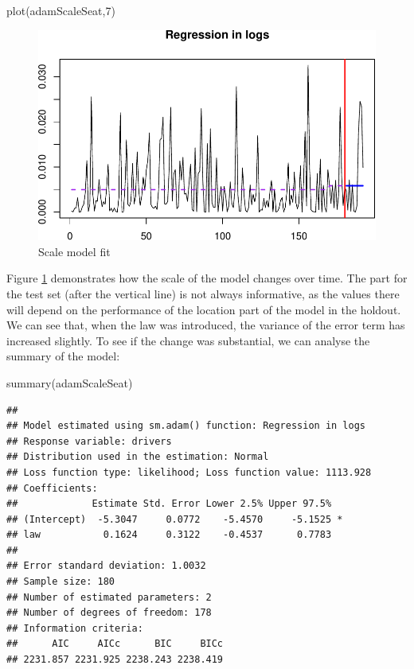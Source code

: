 \documentclass[
]{book}
\newenvironment{Shaded}{\begin{snugshade}}{\end{snugshade}}
\newcommand{\DecValTok}[1]{\textcolor[rgb]{0.00,0.00,0.81}{#1}}
\newcommand{\FunctionTok}[1]{\textcolor[rgb]{0.00,0.00,0.00}{#1}}
\newcommand{\NormalTok}[1]{#1}
\theoremstyle{definition}
\theoremstyle{definition}
\theoremstyle{definition}
\theoremstyle{definition}
\theoremstyle{remark}
\begin{document}
\begin{Shaded}
\begin{Highlighting}[]
\FunctionTok{plot}\NormalTok{(adamScaleSeat,}\DecValTok{7}\NormalTok{)}
\end{Highlighting}
\end{Shaded}

\begin{figure}
\centering
\includegraphics{Svetunkov--2022----ADAM_files/figure-latex/adamModelETSXMNMSMTime-1.pdf}
\caption{\label{fig:adamModelETSXMNMSMTime}Scale model fit}
\end{figure}

Figure \ref{fig:adamModelETSXMNMSMTime} demonstrates how the scale of the model changes over time. The part for the test set (after the vertical line) is not always informative, as the values there will depend on the performance of the location part of the model in the holdout. We can see that, when the law was introduced, the variance of the error term has increased slightly. To see if the change was substantial, we can analyse the summary of the model:

\begin{Shaded}
\begin{Highlighting}[]
\FunctionTok{summary}\NormalTok{(adamScaleSeat)}
\end{Highlighting}
\end{Shaded}

\begin{verbatim}
## 
## Model estimated using sm.adam() function: Regression in logs
## Response variable: drivers
## Distribution used in the estimation: Normal
## Loss function type: likelihood; Loss function value: 1113.928
## Coefficients:
##             Estimate Std. Error Lower 2.5% Upper 97.5%  
## (Intercept)  -5.3047     0.0772    -5.4570     -5.1525 *
## law           0.1624     0.3122    -0.4537      0.7783  
## 
## Error standard deviation: 1.0032
## Sample size: 180
## Number of estimated parameters: 2
## Number of degrees of freedom: 178
## Information criteria:
##      AIC     AICc      BIC     BICc 
## 2231.857 2231.925 2238.243 2238.419
\end{verbatim}
\end{document}
